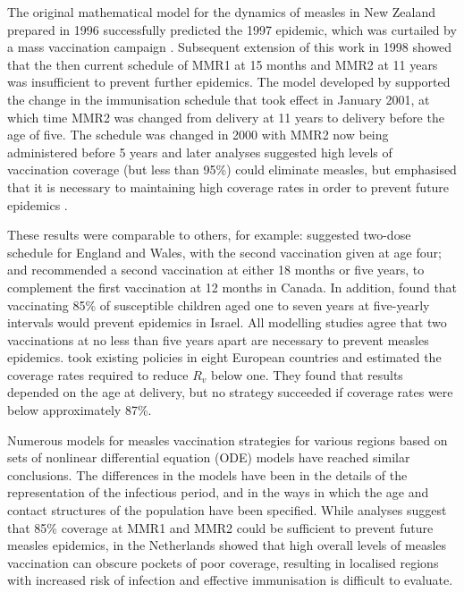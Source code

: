 \documentclass{article}
\begin{document}
The original mathematical model for the dynamics of measles in New Zealand prepared in 1996 \citep{tobias98} successfully predicted the 1997 epidemic, which was curtailed by a mass vaccination campaign \citep{mansoor98,roberts0}. Subsequent extension of this work in 1998 showed that the then current schedule of MMR1 at 15 months and MMR2 at 11 years was insufficient to prevent further epidemics. The model developed by \citep{roberts0} supported the change in the immunisation schedule that took effect in January 2001, at which time MMR2 was changed from delivery at 11 years to delivery before the age of five. The schedule was changed in 2000 with MMR2 now being administered before 5 years \citep{anon2a} and later analyses suggested high levels of vaccination coverage (but less than 95\%) could eliminate measles, but emphasised that it is necessary to maintaining high coverage rates in order to prevent future epidemics \citep{roberts4}.

These results were comparable to others, for example: \citep{babad95} suggested two-dose schedule for England and Wales, with the second vaccination given at age four; and \citep{gay98} recommended a second vaccination at either 18 months or five years, to complement the first vaccination at 12 months in Canada. In addition, \citep{agur93} found that vaccinating 85\% of susceptible children aged one to seven years at five-yearly intervals would prevent epidemics in Israel. All modelling studies agree that two vaccinations at no less than five years apart are necessary to prevent measles epidemics. \citep{wallinga1} took existing policies in eight European countries and estimated the coverage rates required to reduce $R_v$ below one. They found that results depended on the age at delivery, but no strategy succeeded if coverage rates were below approximately 87\%.

Numerous models for measles vaccination strategies for various regions \citep{agur93, babad95, edmunds0, gay98, wallinga1} based on sets of nonlinear differential equation (ODE) models have reached similar conclusions. The differences in the models have been in the details of the representation of the infectious period, and in the ways in which the age and contact structures of the population have been specified. While analyses suggest that 85\% coverage at MMR1 and MMR2 could be sufficient to prevent future measles epidemics, \citep{glass4} in the Netherlands showed that high overall levels of measles vaccination can obscure pockets of poor coverage, resulting in localised regions with increased risk of infection and effective immunisation is difficult to evaluate. 
\end{document}

